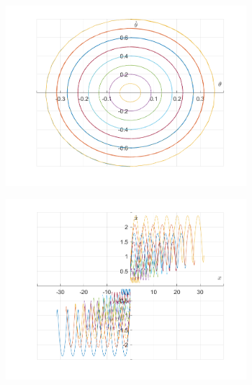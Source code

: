 \documentclass{article}
\begin{document}
	\begin{figure}[h!]
		\centering
		\begin{subfigure}[b]{0.48\linewidth}
			\includegraphics[width=\linewidth]{./SmallOscillations/S11/F5.png}
		\end{subfigure}
		\begin{subfigure}[b]{0.48\linewidth}
			\includegraphics[width=\linewidth]{./SmallOscillations/S11/F6.png}
		\end{subfigure}
	\end{figure}
	\newpage
	
\end{document}
